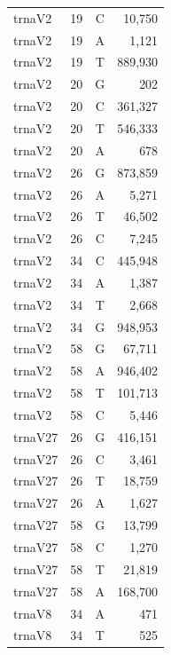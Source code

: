\documentclass[12pt]{rockefeller}
\begin{document}
\begin{tiny}
\begin{longtable}{|l|r|c|r|}
  trnaV2 &        19 &          C &     10,750 \\
  trnaV2 &        19 &          A &      1,121 \\
  trnaV2 &        19 &          T &    889,930 \\
  trnaV2 &        20 &          G &        202 \\
  trnaV2 &        20 &          C &    361,327 \\
  trnaV2 &        20 &          T &    546,333 \\
  trnaV2 &        20 &          A &        678 \\
  trnaV2 &        26 &          G &    873,859 \\
  trnaV2 &        26 &          A &      5,271 \\
  trnaV2 &        26 &          T &     46,502 \\
  trnaV2 &        26 &          C &      7,245 \\
  trnaV2 &        34 &          C &    445,948 \\
  trnaV2 &        34 &          A &      1,387 \\
  trnaV2 &        34 &          T &      2,668 \\
  trnaV2 &        34 &          G &    948,953 \\
  trnaV2 &        58 &          G &     67,711 \\
  trnaV2 &        58 &          A &    946,402 \\
  trnaV2 &        58 &          T &    101,713 \\
  trnaV2 &        58 &          C &      5,446 \\
 trnaV27 &        26 &          G &    416,151 \\
 trnaV27 &        26 &          C &      3,461 \\
 trnaV27 &        26 &          T &     18,759 \\
 trnaV27 &        26 &          A &      1,627 \\
 trnaV27 &        58 &          G &     13,799 \\
 trnaV27 &        58 &          C &      1,270 \\
 trnaV27 &        58 &          T &     21,819 \\
 trnaV27 &        58 &          A &    168,700 \\
  trnaV8 &        34 &          A &        471 \\
  trnaV8 &        34 &          T &        525 \\

\end{longtable}
\end{tiny}
\end{document}
